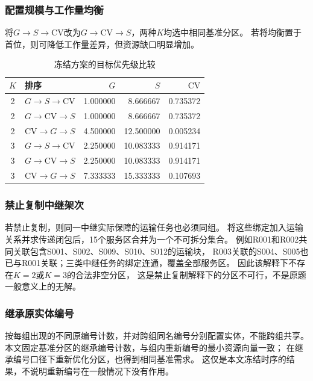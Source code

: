 \documentclass[bwprint]{gmcmthesis}
\begin{document}
\subsubsection{配置规模与工作量均衡}
将$G\to S\to\mathrm{CV}$改为$G\to\mathrm{CV}\to S$，两种$K$均选中相同基准分区。
若将均衡置于首位，则可降低工作量差异，但资源缺口明显增加。
\begin{table}[htbp]
\centering
\small
\caption{冻结方案的目标优先级比较}
\label{tab:q4_priority}
\begin{tabular}{clrrr}
\toprule
$K$ & 排序 & $G$ & $S$ & $\mathrm{CV}$ \\
\midrule
2 & $G\to S\to\mathrm{CV}$ & 1.000000 & 8.666667 & 0.735372 \\
2 & $G\to\mathrm{CV}\to S$ & 1.000000 & 8.666667 & 0.735372 \\
2 & $\mathrm{CV}\to G\to S$ & 4.500000 & 12.500000 & 0.005234 \\
3 & $G\to S\to\mathrm{CV}$ & 2.250000 & 10.083333 & 0.914171 \\
3 & $G\to\mathrm{CV}\to S$ & 2.250000 & 10.083333 & 0.914171 \\
3 & $\mathrm{CV}\to G\to S$ & 7.333333 & 15.333333 & 0.107693 \\
\bottomrule
\end{tabular}
\end{table}

\subsubsection{禁止复制中继架次}
若禁止复制，则同一中继实际保障的运输任务也必须同组。
将这些绑定加入运输关系并求传递闭包后，15个服务区合并为一个不可拆分集合。
例如R001和R002共同关联包含S001、S002、S009、S010、S012的运输块，
R003关联的S004、S005也已与R001关联；三类中继任务的绑定连通，覆盖全部服务区。
因此该解释下不存在$K=2$或$K=3$的合法非空分区，
这是禁止复制解释下的分区不可行，不是原题一般意义上的无解。

\subsubsection{继承原实体编号}
按每组出现的不同原编号计数，并对跨组同名编号分别配置实体，不能跨组共享。
本文固定基准分区的继承编号计数，与组内重新编号的最小资源向量一致；
在继承编号口径下重新优化分区，也得到相同基准需求。
这仅是本文冻结时序的结果，不说明重新编号在一般情况下没有作用。
\end{document}
